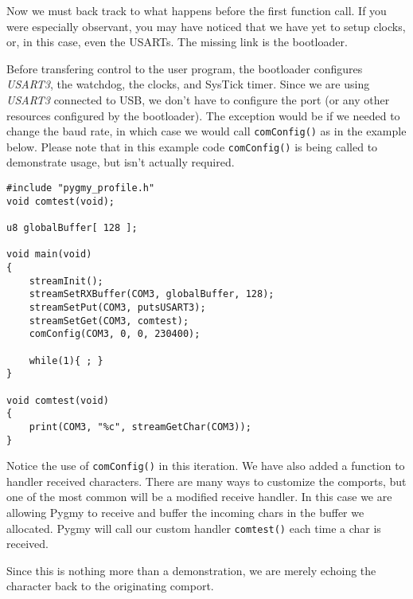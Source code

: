 \documentclass{article}
\begin{document}
Now we must back track to what happens before the first function call. If you were especially observant, you may have noticed that we have yet to setup clocks, or, in this case, even the USARTs. The missing link is the bootloader.

Before transfering control to the user program, the bootloader configures \emph{USART3}, the watchdog, the clocks, and SysTick timer. Since we are using \emph{USART3} connected to USB, we don't have to configure the port (or any other resources configured by the bootloader). The exception would be if we needed to change the baud rate, in which case we would call \verb|comConfig()| as in the example below. Please note that in this example code \verb|comConfig()| is being called to demonstrate usage, but isn't actually required.

\begin{lstlisting}
#include "pygmy_profile.h"
void comtest(void);

u8 globalBuffer[ 128 ];

void main(void)
{
	streamInit();
	streamSetRXBuffer(COM3, globalBuffer, 128);
	streamSetPut(COM3, putsUSART3);
	streamSetGet(COM3, comtest);
	comConfig(COM3, 0, 0, 230400);

	while(1){ ; }
}

void comtest(void)
{
	print(COM3, "%c", streamGetChar(COM3));
}
\end{lstlisting}

Notice the use of \verb|comConfig()| in this iteration. We have also added a function to handler received characters. There are many ways to customize the comports, but one of the most common will be a modified receive handler. In this case we are allowing Pygmy to receive and buffer the incoming chars in the buffer we allocated. Pygmy will call our custom handler \verb|comtest()| each time a char is received.

Since this is nothing more than a demonstration, we are merely echoing the character back to the originating comport.
\end{document}
